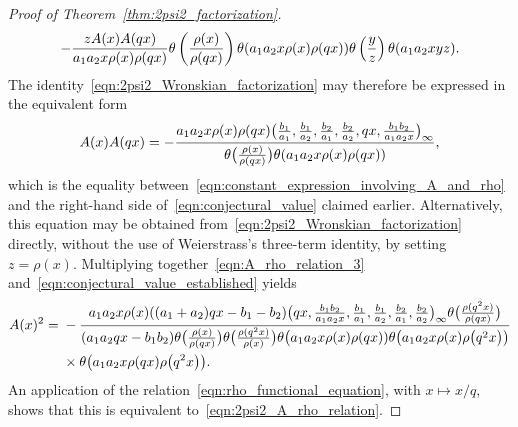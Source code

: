 \documentclass[10pt,a4paper]{amsart}
\numberwithin{equation}{section}
\begin{document}
\begin{proof}[Proof of Theorem~\ref{thm:2psi2_factorization}]
\[ -{z A(x) A(qx) \over a_1a_2x \rho(x)\rho(qx)} \theta\left({\rho(x) \over \rho(qx)}\right) \theta (a_1a_2x\rho(x)\rho(qx) ) \theta\left({y \over z} \right) \theta(a_1a_2xyz). \]
The identity~\eqref{eqn:2psi2_Wronskian_factorization} may therefore be expressed in the equivalent form
\begin{equation} \label{eqn:conjectural_value_established}
A(x) A(qx) = -{a_1a_2x\rho(x)\rho(qx)\bigl({b_1 \over a_1},{b_1 \over a_2},{b_2 \over a_1},{b_2 \over a_2},qx,{b_1b_2 \over a_1a_2x}\bigr)_{ \infty} \over \theta\bigl({\rho(x) \over \rho(qx)}\bigr) \theta(a_1a_2x\rho(x)\rho(qx))},
\end{equation}
which is the equality between~\eqref{eqn:constant_expression_involving_A_and_rho} and the right-hand side of~\eqref{eqn:conjectural_value} claimed earlier. Alternatively, this equation may be obtained from~\eqref{eqn:2psi2_Wronskian_factorization} directly, without the use of Weierstrass's three-term identity, by setting $z=\rho(x)$. Multiplying together~\eqref{eqn:A_rho_relation_3} and~\eqref{eqn:conjectural_value_established} yields{\samepage
\begin{align*}
A(x)^2 ={}& -{a_1a_2x \rho(x) ((a_1+a_2)qx-b_1-b_2 ) \bigl(qx,{b_1b_2 \over a_1a_2x},{b_1 \over a_1},{b_1 \over a_2},{b_2 \over a_1},{b_2 \over a_2}\bigr)_\infty \theta\bigl( {\rho(q^2x) \over \rho(qx)} \bigr) \over (a_1a_2qx-b_1b_2) \theta\bigl({\rho(x) \over \rho(qx)}\bigr) \theta\bigl({\rho(q^2x) \over \rho(x)}\bigr) \theta\bigl(a_1a_2x\rho(x)\rho(qx) ) \theta \bigl(a_1a_2x\rho(x)\rho\bigl(q^2x\bigr) \bigr)} \\
& \times \theta\bigl( a_1a_2x\rho(qx)\rho\bigl(q^2x\bigr)\bigr).
\end{align*}
An application of the relation~\eqref{eqn:rho_functional_equation}, with $x \mapsto x/q$, shows that this is equivalent to~\eqref{eqn:2psi2_A_rho_relation}.}


\end{proof}
\end{document}
